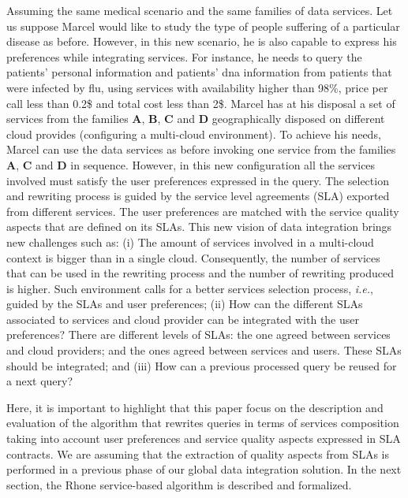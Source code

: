 Assuming the same medical scenario and the same families of data services.
Let us suppose Marcel would like to study the type of people suffering of a particular disease as before. However, in this new scenario, he is also capable to express his preferences while integrating services. For instance, he needs to query the patients' personal information and patients' dna information from patients that were infected by flu, using services with availability higher than 98\%, price per call less than 0.2\$ and total cost less than 2\$. Marcel has at his disposal a set of services from the families \textbf{A}, \textbf{B}, \textbf{C} and \textbf{D} geographically disposed on different cloud provides (configuring a multi-cloud environment). 
To achieve his needs, Marcel can use the data services as before invoking one
service from the families \textbf{A}, \textbf{C} and \textbf{D} in sequence.
However, in this new configuration all the services involved must satisfy the user preferences expressed in the query. The selection and rewriting process is guided by the service level agreements (SLA) exported from different services. The user preferences are matched with the service quality aspects that are defined on its SLAs.
This new vision of data integration brings new challenges such as: 
(i) The amount of services involved in a multi-cloud context is bigger than in a
single cloud. Consequently, the number of services that can be used in the
rewriting process and the number of rewriting produced is higher. Such
environment calls for a better services selection process, \textit{i.e.}, guided
by the SLAs and user preferences; (ii) How can the different SLAs associated to
services and cloud provider can be integrated with the user preferences? There
are different levels of SLAs: the one agreed between services and cloud
providers; and the ones agreed between services and users. These SLAs should be
integrated; and (iii) How can a previous processed query be reused for a next query?

Here, it is important to highlight that this paper focus on the description and
evaluation of the algorithm that rewrites queries in terms of services
composition taking into account user preferences and service quality aspects
expressed in SLA contracts. We are assuming that the extraction of quality
aspects from SLAs is performed in a previous phase of our global data integration solution.
In the next section, the Rhone service-based algorithm is described and formalized.